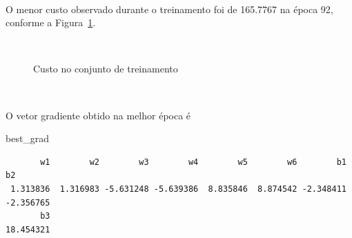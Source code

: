 \documentclass[
  a4paperpaper,
]{article}
\newenvironment{Shaded}{\begin{snugshade}}{\end{snugshade}}
\newcommand{\NormalTok}[1]{\textcolor[rgb]{0.00,0.23,0.31}{#1}}
\begin{document}
~

O menor custo observado durante o treinamento foi de 165.7767 na época
92, conforme a Figura~\ref{fig-resultadosq1}.

~

\begin{figure}[H]


\caption{\label{fig-resultadosq1}Custo no conjunto de treinamento}

\end{figure}%

~

O vetor gradiente obtido na melhor época é

\begin{Shaded}
\begin{Highlighting}[]
\NormalTok{best\_grad}
\end{Highlighting}
\end{Shaded}

\begin{verbatim}
       w1        w2        w3        w4        w5        w6        b1        b2 
 1.313836  1.316983 -5.631248 -5.639386  8.835846  8.874542 -2.348411 -2.356765 
       b3 
18.454321 
\end{verbatim}
\end{document}
